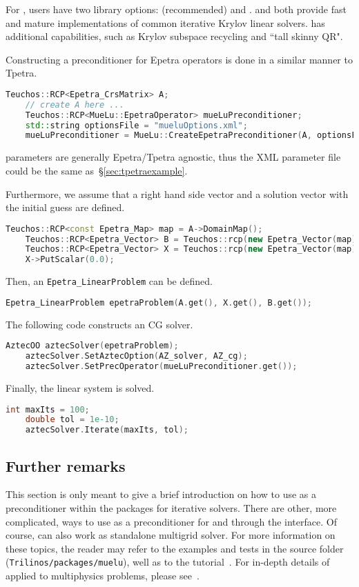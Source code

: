 For \epetra, users have two library options: \belos{} (recommended) and \aztecoo{}.
\aztecoo{} and \belos both provide fast and mature implementations of common iterative Krylov linear solvers.
\belos has additional capabilities, such as Krylov subspace recycling and ``tall skinny QR".

Constructing a \muelu{} preconditioner for Epetra operators is done in a similar
manner to Tpetra.
\begin{lstlisting}[language=C++]
    Teuchos::RCP<Epetra_CrsMatrix> A;
    // create A here ...
    Teuchos::RCP<MueLu::EpetraOperator> mueLuPreconditioner;
    std::string optionsFile = "mueluOptions.xml";
    mueLuPreconditioner = MueLu::CreateEpetraPreconditioner(A, optionsFile);
\end{lstlisting}
\muelu{} parameters are generally Epetra/Tpetra agnostic, thus the XML parameter file
could be the same as~\S\ref{sec:tpetraexample}.

Furthermore, we assume that a right hand side vector and a solution vector with
the initial guess are defined.
\begin{lstlisting}[language=C++]
    Teuchos::RCP<const Epetra_Map> map = A->DomainMap();
    Teuchos::RCP<Epetra_Vector> B = Teuchos::rcp(new Epetra_Vector(map));
    Teuchos::RCP<Epetra_Vector> X = Teuchos::rcp(new Epetra_Vector(map));
    X->PutScalar(0.0);
\end{lstlisting}

Then, an \texttt{Epetra\_LinearProblem} can be defined.
\begin{lstlisting}[language=C++]
    Epetra_LinearProblem epetraProblem(A.get(), X.get(), B.get());
\end{lstlisting}

The following code constructs an \aztecoo{} CG solver.
\begin{lstlisting}[language=C++]
    AztecOO aztecSolver(epetraProblem);
    aztecSolver.SetAztecOption(AZ_solver, AZ_cg);
    aztecSolver.SetPrecOperator(mueLuPreconditioner.get());
\end{lstlisting}

Finally, the linear system is solved.
\begin{lstlisting}[language=C++]
    int maxIts = 100;
    double tol = 1e-10;
    aztecSolver.Iterate(maxIts, tol);
\end{lstlisting}

\subsection{Further remarks}

This section is only meant to give a brief introduction on how to use \muelu{}
as a preconditioner within the \trilinos{} packages for iterative solvers. There
are other, more complicated, ways to use \muelu{} as a preconditioner for \belos
and \aztecoo through the \xpetra interface. Of course, \muelu{} can also work as
standalone multigrid solver. For more information on these topics, the reader
may refer to the examples and tests in the \muelu{} source folder
(\texttt{Trilinos/packages/muelu}), well as to the \muelu{} tutorial~\cite{MueLuTutorial}.
For in-depth details of \muelu applied to multiphysics problems, please see~\cite{Wiesner2014}.
